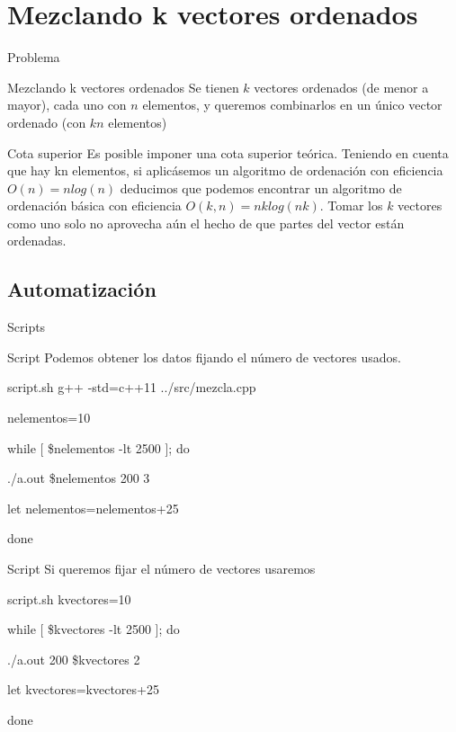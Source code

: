 
\section{Mezclando k vectores ordenados}

\begin{frame}{Problema}
	\begin{block}{Mezclando k vectores ordenados}
	Se tienen $k$ vectores ordenados (de menor a mayor), cada uno con $n$ elementos, y 				queremos combinarlos en un único vector ordenado (con $kn$ elementos)
	\end{block}

	\begin{block}{Cota superior}
	Es posible imponer una cota superior teórica. Teniendo en cuenta que hay kn elementos, 	si aplicásemos un algoritmo 	de ordenación con eficiencia $O(n) = nlog(n)$ deducimos 			que podemos encontrar un algoritmo de ordenación básica con eficiencia $O(k, n) = 
	nklog(nk)$. Tomar los $k$ vectores como uno solo no aprovecha aún el hecho de que 			partes del vector están ordenadas.
	\end{block}
\end{frame}

\subsection{Automatización}
\begin{frame}{Scripts}
	\begin{block}{Script}
		Podemos obtener los datos fijando el n\'umero de vectores usados.
	\end{block}
	
	\begin{exampleblock}{script.sh}
	g++ -std=c++11 ../src/mezcla.cpp

	nelementos=10

	while [ \$nelementos -lt 2500 ]; do
    
    		./a.out \$nelementos 200 3
    
    		let nelementos=nelementos+25
	
	done
	\end{exampleblock}
\end{frame}


\begin{frame}
	\begin{block}{Script}
		Si queremos fijar el n\'umero de vectores usaremos
	\end{block}
	
	\begin{exampleblock}{script.sh}
	kvectores=10

	while [ \$kvectores -lt 2500 ]; do
    
    		./a.out 200 \$kvectores 2
    	
    		let kvectores=kvectores+25

	done
	\end{exampleblock}
\end{frame}

